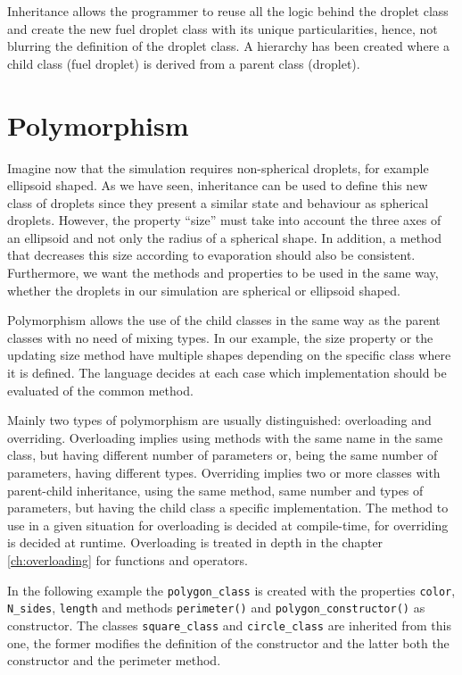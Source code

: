 Inheritance allows the programmer to reuse all the logic behind the droplet class 
and create the new fuel droplet class with its unique particularities, hence, not blurring the 
definition of the droplet class.
A hierarchy has been created where a child class (fuel droplet) is derived from a parent class (droplet).




    \section{Polymorphism} 

Imagine now that the simulation requires non-spherical droplets, for example ellipsoid shaped. 
As we have seen, inheritance can be used to define this new class of droplets since they present a similar state and behaviour as spherical droplets.
However, the property ``size'' must take into account the three axes of an ellipsoid and not only the radius of a spherical shape. 
In addition, a method that decreases this size according to evaporation should also be consistent. 
Furthermore, we want the methods and properties to be used in the same way, whether the droplets in our simulation are spherical or ellipsoid shaped.

Polymorphism allows the use of the child classes in the same way as the parent classes with no need of mixing types. 
In our example, the size property or the updating size method have multiple shapes depending on the specific class where it is defined. 
The language decides at each case which implementation should be evaluated of the common method.
 
Mainly two types of polymorphism are usually distinguished: overloading and overriding. 
Overloading implies using methods with the same name in the same class, but 
having different number of parameters or, being the same number of parameters, having different types.
Overriding implies two or more classes with parent-child inheritance, using the same method, same number and types of parameters, 
but having the child class a specific implementation.
The method to use in a given situation for overloading is decided at compile-time,
for overriding is decided at runtime. 
Overloading is treated in depth in the chapter \ref{ch:overloading} for functions and operators. 


\newpage
In the following example the \texttt{polygon\_class} is created with 
the properties \texttt{color}, \texttt{N\_sides}, \texttt{length} and 
methods \texttt{perimeter()} and \texttt{polygon\_constructor()} as constructor. 
The classes \texttt{square\_class} and \texttt{circle\_class} are inherited from this one, 
the former modifies the definition of the constructor and 
the latter both the constructor and the perimeter method. 

